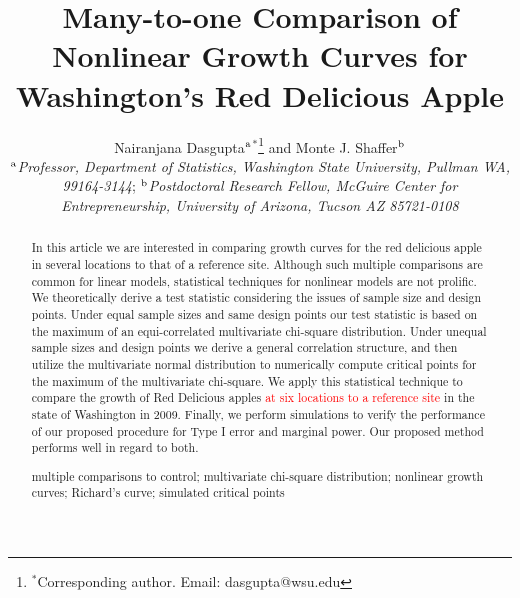 \documentclass[useAMS]{cJAS2e}
\newcommand{\changed}[1]{\textcolor{red}{#1}}
\begin{document}
   






\title{Many-to-one Comparison of Nonlinear Growth Curves for Washington's Red Delicious Apple}

\author{Nairanjana Dasgupta$^{\rm a}$$^{\ast}$\thanks{$^\ast$Corresponding author. Email: dasgupta@wsu.edu
\vspace{6pt}} and Monte J. Shaffer$^{\rm b}$\\\vspace{6pt}  $^{\rm a}${\em{Professor, Department of Statistics, Washington State University, Pullman WA, 99164-3144}}; $^{\rm b}${\em{Postdoctoral Research Fellow,  McGuire Center for Entrepreneurship, University of Arizona, Tucson AZ 85721-0108}}\\\vspace{6pt} }



\maketitle

\begin{abstract}
In this article we are interested in comparing growth curves for the red delicious apple in several locations to that of a reference site.  Although such multiple comparisons are common for linear models, statistical techniques for nonlinear models are not prolific.  We theoretically derive a test statistic considering the issues of sample size and design points. Under equal sample sizes and same design points our test statistic is based on the  maximum of an equi-correlated multivariate chi-square distribution.  Under unequal sample sizes and design points we derive a general correlation structure, and then utilize the multivariate normal distribution to numerically compute critical points for the maximum of the multivariate chi-square.  We apply this statistical technique to compare the growth of Red Delicious apples \changed{at six locations to a reference site} in the state of Washington in 2009.  Finally, we perform simulations to verify the performance of our proposed procedure for Type I error and marginal power.  Our proposed method performs well in regard to both.

\bigskip

\begin{keywords}multiple comparisons to control; multivariate chi-square distribution; nonlinear growth curves; Richard's curve; simulated critical points
\end{keywords}\bigskip

\end{abstract}
\end{document}
